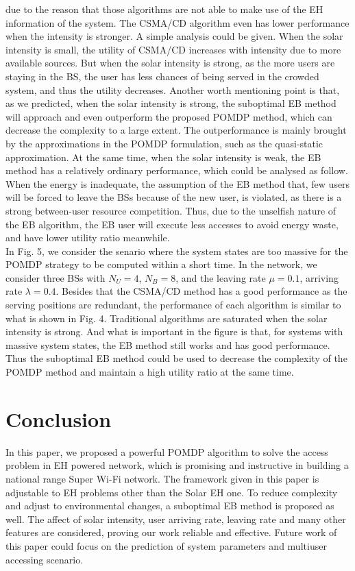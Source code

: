 \documentclass[conference]{IEEEtran}
\begin{document}
due to the reason that those algorithms are not able to make use of the EH information of the system.
The CSMA/CD algorithm even has lower performance when the intensity is stronger.
A simple analysis could be given.
When the solar intensity is small, the utility of CSMA/CD increases with intensity due to more available sources.
But when the solar intensity is strong, as the more users are staying in the BS,
the user has less chances of being served in the crowded system, and thus the utility decreases.
Another worth mentioning point is that, as we predicted, when the solar intensity is strong,
the suboptimal EB method will approach and even outperform the proposed POMDP method,
which can decrease the complexity to a large extent.
The outperformance is mainly brought by the approximations in the POMDP formulation,
such as the quasi-static approximation.
At the same time, 
when the solar intensity is weak, the EB method has a relatively ordinary performance,
which could be analysed as follow.
When the energy is inadequate, the assumption of the EB method that, 
few users will be forced to leave the BSs because of the new user, is violated, 
as there is a strong between-user resource competition.
Thus, due to the unselfish nature of the EB algorithm,
the EB user will execute less accesses to avoid energy waste,
and have lower utility ratio meanwhile. 
\\
\indent 
In Fig. 5, we consider the senario where the system states are too massive 
for the POMDP strategy to be computed within a short time.
In the network, we consider three BSs with \(N_U = 4\), \(N_B = 8\),
and the leaving rate \(\mu = 0.1\), arriving rate \(\lambda = 0.4\).
Besides that the CSMA/CD method has a good performance as the serving positions are redundant,
the performance of each algorithm is similar to what is shown in Fig. 4.
Traditional algorithms are saturated when the solar intensity is strong.
And what is important in the figure is that, for systems with massive system states,
the EB method still works and has good performance. 
Thus the suboptimal EB method could be used to decrease the complexity of the POMDP method
and maintain a high utility ratio at the same time.
\section{Conclusion}
In this paper, we proposed a powerful POMDP algorithm to solve the access problem in EH powered network,
which is promising and instructive in building a national range Super Wi-Fi network.
The framework given in this paper is adjustable to EH problems other than the Solar EH one.
To reduce complexity and adjust to environmental changes, a suboptimal EB method is proposed as well.
The affect of solar intensity, user arriving rate, leaving rate and many other features are considered,
proving our work reliable and effective.
Future work of this paper could focus on the prediction of system parameters and multiuser accessing scenario.


\end{document}
